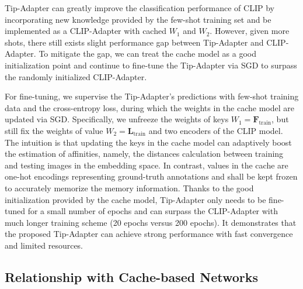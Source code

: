 \documentclass[10pt,twocolumn,letterpaper]{article}
\begin{document}

Tip-Adapter can greatly improve the classification performance of CLIP by incorporating new knowledge provided by the few-shot training set and be implemented as a CLIP-Adapter with cached $W_1$ and $W_2$. 
However, given more shots, there still exists slight performance gap between Tip-Adapter and CLIP-Adapter. 
To mitigate the gap, we can treat the cache model as a good initialization point and continue to fine-tune the Tip-Adapter via SGD to surpass the randomly initialized CLIP-Adapter.

For fine-tuning, we supervise the Tip-Adapter's predictions with few-shot training data and the cross-entropy loss, during which the weights in the cache model are updated via SGD. Specifically, we unfreeze the weights of keys $W_1 = \mathbf{F}_\mathrm{train}$, but still fix the weights of value $W_2 = \mathbf{L}_\mathrm{train}$ and two encoders of the CLIP model. The intuition is that updating the keys in the cache model can adaptively boost the estimation of affinities, namely, the distances calculation between training and testing images in the embedding space. In contrast, values in the cache are one-hot encodings representing ground-truth annotations and shall be kept frozen to accurately memorize the memory information. Thanks to the good initialization provided by the cache model, Tip-Adapter only needs to be fine-tuned for a small number of epochs and can surpass the CLIP-Adapter with much longer training scheme (20 epochs versus 200 epochs). It demonstrates that the proposed Tip-Adapter can achieve strong performance with fast convergence and limited resources.



\subsection{Relationship with Cache-based Networks}
\label{cache}
\end{document}
